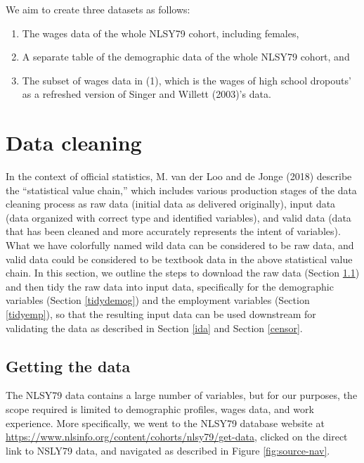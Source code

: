 \documentclass{article}
\providecommand{\tightlist}{%
  \setlength{\itemsep}{0pt}\setlength{\parskip}{0pt}}
\begin{document}
We aim to create three datasets as follows:

\begin{enumerate}
\def\labelenumi{\arabic{enumi}.}
\tightlist
\item
  The wages data of the whole NLSY79 cohort, including females,
\item
  A separate table of the demographic data of the whole NLSY79 cohort, and
\item
  The subset of wages data in (1), which is the wages of high school dropouts' as a refreshed version of Singer and Willett (2003)'s data.
\end{enumerate}

\hypertarget{cleaning}{%
\section{Data cleaning}\label{cleaning}}

In the context of official statistics, M. van der Loo and de Jonge (2018) describe the ``statistical value chain,'' which includes various production stages of the data cleaning process as raw data (initial data as delivered originally), input data (data organized with correct type and identified variables), and valid data (data that has been cleaned and more accurately represents the intent of variables). What we have colorfully named wild data can be considered to be raw data, and valid data could be considered to be textbook data in the above statistical value chain. In this section, we outline the steps to download the raw data (Section \ref{getdata}) and then tidy the raw data into input data, specifically for the demographic variables (Section \ref{tidydemog}) and the employment variables (Section \ref{tidyemp}), so that the resulting input data can be used downstream for validating the data as described in Section \ref{ida} and Section \ref{censor}.

\hypertarget{getdata}{%
\subsection{Getting the data}\label{getdata}}

The NLSY79 data contains a large number of variables, but for our purposes, the scope required is limited to demographic profiles, wages data, and work experience. More specifically, we went to the NLSY79 database website at \url{https://www.nlsinfo.org/content/cohorts/nlsy79/get-data}, clicked on the direct link to NSLY79 data, and navigated as described in Figure \ref{fig:source-nav}.
\end{document}
